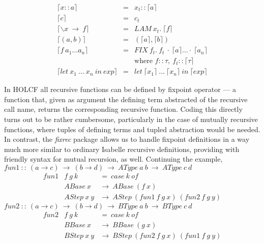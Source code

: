 \documentclass{llncs}
\begin{document}
$$\begin{array}{lcl} 
  \lceil x::a \rceil & = & x_{t}::\lceil a \rceil \\
  \lceil c \rceil & = & c_{t} \\
  \lceil \backslash x \ \to \ f \rceil & = & LAM \ x_{t}. \ \lceil f \rceil \\
  \lceil (a,b) \rceil & = & (\lceil a \rceil, \lceil b \rceil) \\
  \lceil f \ a_{1} \ldots a_{n} \rceil & = & FIX \ f_{t}. \ f_{t} \ \cdot \ 
  \lceil a \rceil \ldots \cdot \ \lceil a_{n} \rceil \\
  & & \mbox{where } f::\tau, \ f_{t}::\lceil \tau \rceil \\
  \lceil let \ x_{1} \ \dots \ x_{n} \ in \ exp \rceil & = 
         & let \ \lceil x_{1} \rceil \ \dots \ \lceil x_{n} \rceil \ in \ \lceil exp \rceil
\end{array}$$

\noindent In HOLCF all recursive functions can be defined by fixpoint
operator --- a function that, given as argument the defining term
abstracted of the recursive call name, returns the corresponding
recursive function.  Coding this directly turns out to be rather
cumbersome, particularly in the case of mutually recursive functions,
where tuples of defining terms and tupled abstraction would be needed.
In contrast, the \emph{fixrec} package allows us to handle fixpoint
definitions in a way much more similar to ordinary Isabelle recursive
definitions, providing with friendly syntax for mutual recursion,
as well. Continuing the example,\\

\noindent $ fun1 \ :: \ (a \to c) \ \to \ (b \to d) \
\to \ AType \ a \ b \ \to \ AType \ c \ d $ 
$$\begin{array}{lll}
  fun1 & f \ g \ k  & = \ case \ k \ of \\
  & ABase \ x & \to \ ABase \ (f \ x) \\
  & AStep \ x \ y & \to \ AStep \ (fun1 \ f \ g \ x) \ (fun2 \ f \ g \
  y)
\end{array} $$
$ fun2 \ :: \ (a \to c) \ \to \ (b \to d) \ \to \ BType \ a \ b \ \to \ BType \ c \ d $
$$\begin{array}{lll}
  fun2 & f \ g \ k & = \ case \ k \ of \\
  & BBase \ x & \to \ BBase \ (g \ x) \\
  & BStep \ x \ y & \to \ BStep \ (fun2 \ f \ g \ x) \ (fun1 \ f \ g \ y)
\end{array} $$ 
\end{document}
